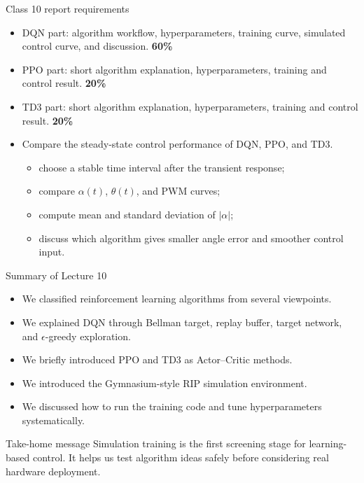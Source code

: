 \documentclass[aspectratio=169]{beamer}
\begin{document}
\begin{frame}{Class 10 report requirements}
\begin{itemize}
    \item DQN part: algorithm workflow, hyperparameters, training curve, simulated control curve, and discussion. \textbf{60\%}
    \vspace{0.18cm}

    \item PPO part: short algorithm explanation, hyperparameters, training and control result. \textbf{20\%}
    \vspace{0.18cm}

    \item TD3 part: short algorithm explanation, hyperparameters, training and control result. \textbf{20\%}
    \vspace{0.18cm}

    \item Compare the steady-state control performance of DQN, PPO, and TD3.
    \vspace{0.12cm}
    \begin{itemize}
        \item choose a stable time interval after the transient response;
        \item compare \(\alpha(t)\), \(\theta(t)\), and PWM curves;
        \item compute mean and standard deviation of \(|\alpha|\);
        \item discuss which algorithm gives smaller angle error and smoother control input.
    \end{itemize}
\end{itemize}
\end{frame}

\begin{frame}{Summary of Lecture 10}
\begin{itemize}
    \item We classified reinforcement learning algorithms from several viewpoints.
   
    \item We explained DQN through Bellman target, replay buffer, target network, and \(\epsilon\)-greedy exploration.

    \item We briefly introduced PPO and TD3 as Actor--Critic methods.

    \item We introduced the Gymnasium-style RIP simulation environment.

    \item We discussed how to run the training code and tune hyperparameters systematically.
\end{itemize}

\vspace{0.2cm}
\begin{alertblock}{Take-home message}
\small
Simulation training is the first screening stage for learning-based control. It helps us test algorithm ideas safely before considering real hardware deployment.
\end{alertblock}
\end{frame}
\end{document}
